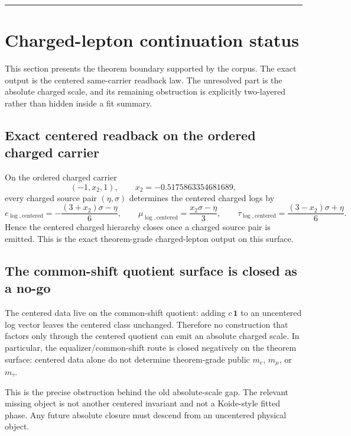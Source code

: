 \begin{center}\rule{0.5\linewidth}{0.5pt}\end{center}
\section{Charged-lepton continuation status}\label{13-the-koide-formula}

This section presents the theorem boundary supported by the corpus. The exact output is the centered same-carrier readback law. The unresolved part is the absolute charged scale, and its remaining obstruction is explicitly two-layered rather than hidden inside a fit summary.

\subsection{Exact centered readback on the ordered charged carrier}\label{131-numerical-verification}

On the ordered charged carrier
\[
(-1,x_2,1),
\qquad
x_2=-0.5175863354681689,
\]
every charged source pair \((\eta,\sigma)\) determines the centered charged logs by
\[
e_{\log,\mathrm{centered}}
=
-\frac{(3+x_2)\sigma-\eta}{6},
\qquad
\mu_{\log,\mathrm{centered}}
=
\frac{x_2\sigma-\eta}{3},
\qquad
\tau_{\log,\mathrm{centered}}
=
\frac{(3-x_2)\sigma+\eta}{6}.
\]
Hence the centered charged hierarchy closes once a charged source pair is emitted. This is the exact theorem-grade charged-lepton output on this surface.

\subsection{The common-shift quotient surface is closed as a no-go}\label{132-zux2083-holonomy-parameterization}

The centered data live on the common-shift quotient: adding \(c\,\mathbf 1\) to an uncentered log vector leaves the centered class unchanged. Therefore no construction that factors only through the centered quotient can emit an absolute charged scale. In particular, the equalizer/common-shift route is closed negatively on the theorem surface: centered data alone do not determine theorem-grade public \(m_e\), \(m_\mu\), or \(m_\tau\).

This is the precise obstruction behind the old absolute-scale gap. The relevant missing object is not another centered invariant and not a Koide-style fitted phase. Any future absolute closure must descend from an uncentered physical object.

